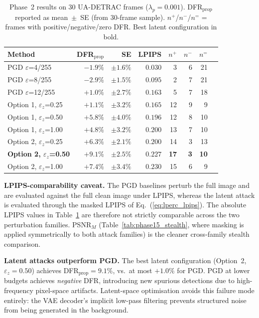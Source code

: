 \documentclass[12pt,a4paper]{report}
\begin{document}
\begin{table}[htbp]
  \centering
  \caption{Phase~2 results on 30 UA-DETRAC frames ($\lambda_p = 0.001$).
           DFR$_{\text{prop}}$ reported as mean~$\pm$~SE (from 30-frame sample).
           $n^+$/$n^-$/$n^=$ = frames with positive/negative/zero DFR.
           Best latent configuration in bold.}
  \label{tab:phase2_main}
  \small
  \begin{tabular}{@{}lrrrrrrr@{}}
    \toprule
    \textbf{Method} & \textbf{DFR$_{\text{prop}}$} & \textbf{SE}
      & \textbf{LPIPS} & $n^+$ & $n^-$ & $n^=$ \\
    \midrule
    PGD $\varepsilon$=4/255   & $-1.9\%$ & $\pm1.6\%$ & $0.030$ & 3  & 6 & 21 \\
    PGD $\varepsilon$=8/255   & $-2.9\%$ & $\pm1.5\%$ & $0.095$ & 2  & 7 & 21 \\
    PGD $\varepsilon$=12/255  & $+1.0\%$ & $\pm2.7\%$ & $0.163$ & 5  & 7 & 18 \\
    \midrule
    Option 1, $\varepsilon_z$=0.25 & $+1.1\%$ & $\pm3.2\%$ & $0.165$ & 12 & 9 & 9 \\
    Option 1, $\varepsilon_z$=0.50 & $+5.8\%$ & $\pm4.0\%$ & $0.196$ & 12 & 8 & 10 \\
    Option 1, $\varepsilon_z$=1.00 & $+4.8\%$ & $\pm3.2\%$ & $0.200$ & 13 & 7 & 10 \\
    \midrule
    Option 2, $\varepsilon_z$=0.25 & $+6.3\%$ & $\pm2.1\%$ & $0.200$ & 14 & 3 & 13 \\
    \textbf{Option 2, $\varepsilon_z$=0.50} & $\mathbf{+9.1\%}$ & $\mathbf{\pm2.5\%}$ & $0.227$ & \textbf{17} & \textbf{3} & \textbf{10} \\
    Option 2, $\varepsilon_z$=1.00 & $+7.4\%$ & $\pm3.4\%$ & $0.230$ & 15 & 6 & 9 \\
    \bottomrule
  \end{tabular}
\end{table}

\noindent\textbf{LPIPS-comparability caveat.}
The PGD baselines perturb the full image and are evaluated against the full
clean image under LPIPS, whereas the latent attack is evaluated through the
masked LPIPS of Eq.~(\ref{eq:lperc_lpips}). The absolute LPIPS values in
Table~\ref{tab:phase2_main} are therefore not strictly comparable across
the two perturbation families. PSNR$_M$ (Table~\ref{tab:phase15_stealth},
where masking is applied symmetrically to both attack families) is the
cleaner cross-family stealth comparison.

\textbf{Latent attacks outperform PGD.}
The best latent configuration (Option~2, $\varepsilon_z=0.50$) achieves
DFR$_{\text{prop}} = 9.1\%$, vs.\ at most $+1.0\%$ for PGD. PGD at lower
budgets achieves \emph{negative} DFR, introducing new spurious detections due to
high-frequency pixel-space artifacts. Latent-space optimisation avoids this failure
mode entirely: the VAE decoder's implicit low-pass filtering prevents structured
noise from being generated in the background.
\end{document}
